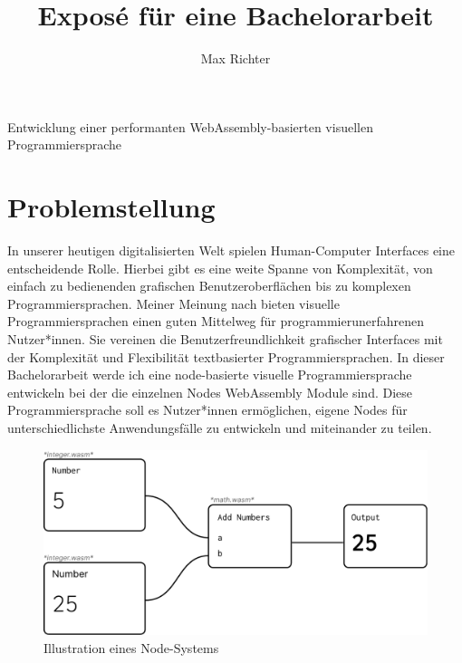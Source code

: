 \documentclass[ngerman]{article}
\title{Exposé für eine Bachelorarbeit}
\author{Max Richter}
\begin{document}
\pagestyle{fancy}
\fancyhead{} %
\fancyfoot{} %
\fancyfoot[LE,RO]{\thepage}

\raggedright

\maketitle
\pagebreak

{\LARGE Entwicklung einer performanten WebAssembly-basierten visuellen Programmiersprache}

\section{Problemstellung}
In unserer heutigen digitalisierten Welt spielen Human-Computer Interfaces eine entscheidende Rolle. Hierbei gibt es eine weite Spanne von Komplexität, von einfach zu bedienenden grafischen Benutzeroberflächen bis zu komplexen Programmiersprachen. Meiner Meinung nach bieten visuelle Programmiersprachen einen guten Mittelweg für programmierunerfahrenen Nutzer*innen.
Sie vereinen die Benutzerfreundlichkeit grafischer Interfaces mit der Komplexität und Flexibilität textbasierter Programmiersprachen. 
\linebreak
\linebreak
In dieser Bachelorarbeit werde ich eine node-basierte visuelle Programmiersprache entwickeln bei der die einzelnen Nodes WebAssembly Module sind. Diese Programmiersprache soll es Nutzer*innen ermöglichen, eigene Nodes für unterschiedlichste Anwendungsfälle zu entwickeln und miteinander zu teilen.
\begin{figure}[h]
\includegraphics[width=\textwidth]{ideas/nodes.pdf}
\caption{Illustration eines Node-Systems}
\end{figure}
\end{document}

